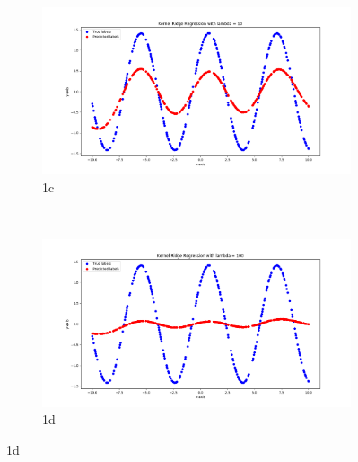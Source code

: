 \documentclass[a4paper,11pt]{article}
\begin{document}
\begin{mlsolution}
\begin{figure}[!htbp]
	\label{fig1b}
	\begin{subfigure}{0.5\textwidth}
		\centering
		\includegraphics[width=1.8\textwidth]{images/krr_10.png}
		\caption{1c}
		\label{1c}
	\end{subfigure}
	\\
	\begin{subfigure}{0.5\textwidth}
		\centering
		\includegraphics[width=1.8\textwidth]{images/krr_100.png}
		\caption{1d}
		\label{1d}
	\end{subfigure}
\end{figure}

\begin{table}[!htbp]
	
	\begin{center}
		\begin{tabular}{|c|c|c|}
			

\end{tabular}
\end{center}
\end{table}
\end{mlsolution}
\end{document}
